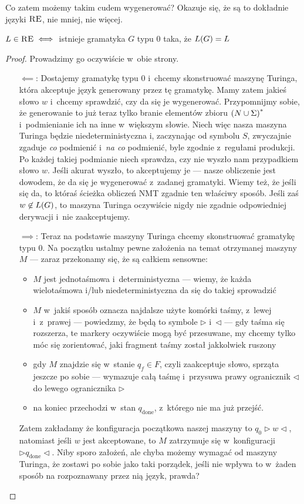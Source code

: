 Co zatem możemy takim cudem wygenerować? Okazuje się, że są to dokładnie języki \(\textsc{RE}\), nie mniej, nie więcej.
\begin{theorem}
    \(L \in \textsc{RE} \iff\) istnieje gramatyka \(G\) typu 0 taka, że \(L\pars{G} = L\)
\end{theorem}
\begin{proof}
    Prowadzimy go oczywiście w~obie strony.
    \begin{itemize}
        \item[\(\impliedby\):] Dostajemy gramatykę typu 0 i~chcemy skonstruować maszynę Turinga, która akceptuje język generowany przez tę gramatykę. Mamy zatem jakieś słowo \(w\) i~chcemy sprawdzić, czy da się je wygenerować. Przypomnijmy sobie, że generowanie to już teraz tylko branie elementów zbioru \(\left(N \cup \Sigma\right)^*\) i~podmienianie ich na inne w~większym słowie. Niech więc nasza maszyna Turinga będzie niedeterministyczna i, zaczynając od symbolu \(S\), zwyczajnie zgaduje \emph{co} podmienić i~\emph{na co} podmienić, byle zgodnie z~regułami produkcji. Po każdej takiej podmianie niech sprawdza, czy nie wyszło nam przypadkiem słowo \(w\). Jeśli akurat wyszło, to akceptujemy je --- nasze obliczenie jest dowodem, że da się je wygenerować z~zadanej gramatyki. Wiemy też, że jeśli się da, to któraś ścieżka obliczeń NMT zgadnie ten właściwy sposób. Jeśli zaś \(w \not\in L\pars{G}\), to maszyna Turinga oczywiście nigdy nie zgadnie odpowiedniej derywacji i~nie zaakceptujemy.
        \item[\(\implies\):] Teraz na podstawie maszyny Turinga chcemy skonstruować gramatykę typu 0. Na początku ustalmy pewne założenia na temat otrzymanej maszyny \(M\) --- zaraz przekonamy się, że są całkiem sensowne:
            \begin{itemize}
                \item \(M\) jest jednotaśmowa i~deterministyczna --- wiemy, że każda wielotaśmowa i/lub niedeterministyczna da się do takiej sprowadzić
                \item \(M\) w~jakiś sposób oznacza najdalsze użyte komórki taśmy, z~lewej i~z~prawej --- powiedzmy, że będą to symbole \(\triangleright\) i~\(\triangleleft\) --- gdy taśma się rozszerza, te markery oczywiście mogą być przesuwane, my chcemy tylko móc się zorientować, jaki fragment taśmy został jakkolwiek ruszony
                \item gdy \(M\) znajdzie się w~stanie \(q_f \in F\), czyli zaakceptuje słowo, sprząta jeszcze po sobie --- wymazuje całą taśmę i~przysuwa prawy ogranicznik \(\triangleleft\) do lewego ogranicznika \(\triangleright\)
                \item na koniec przechodzi w~stan \(q_\textrm{done}\), z~którego nie ma już przejść.
            \end{itemize}
            Zatem zakładamy że konfiguracja początkowa naszej maszyny to \(q_0\triangleright w\triangleleft\), natomiast jeśli \(w\) jest akceptowane, to \(M\) zatrzymuje się w~konfiguracji \(\triangleright q_\textrm{done}\triangleleft\). Niby sporo założeń, ale chyba możemy wymagać od maszyny Turinga, że zostawi po sobie jako taki porządek, jeśli nie wpływa to w~żaden sposób na rozpoznawany przez nią język, prawda?
            

\end{itemize}
\end{proof}
